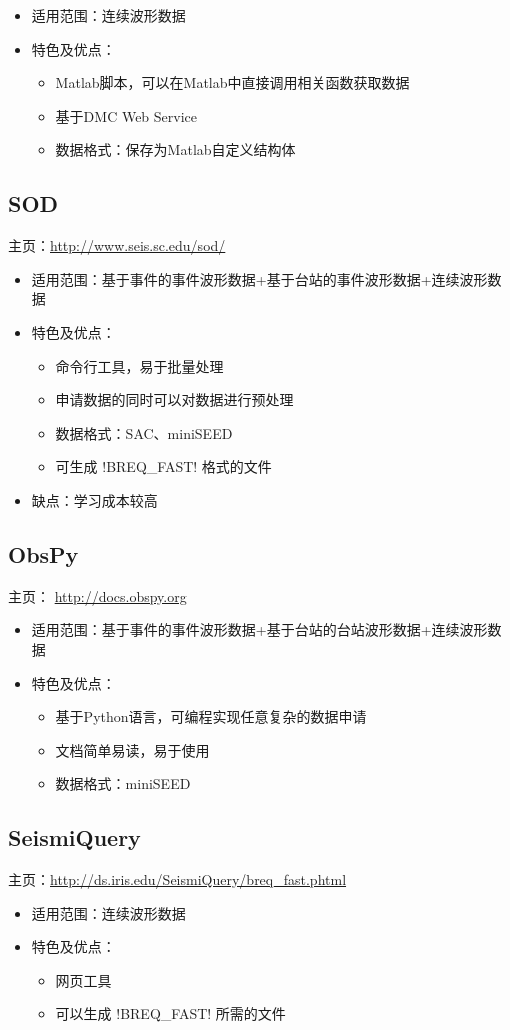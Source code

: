 \begin{itemize}
\item 适用范围：连续波形数据
\item 特色及优点：
    \begin{itemize}
    \item Matlab脚本，可以在Matlab中直接调用相关函数获取数据
    \item 基于DMC Web Service
    \item 数据格式：保存为Matlab自定义结构体
    \end{itemize}
\end{itemize}

\subsection{SOD}
主页：\url{http://www.seis.sc.edu/sod/}

\begin{itemize}
\item 适用范围：基于事件的事件波形数据+基于台站的事件波形数据+连续波形数据
\item 特色及优点：
    \begin{itemize}
    \item 命令行工具，易于批量处理
    \item 申请数据的同时可以对数据进行预处理
    \item 数据格式：SAC、miniSEED
    \item 可生成 !BREQ_FAST! 格式的文件
    \end{itemize}
\item 缺点：学习成本较高
\end{itemize}

\subsection{ObsPy}
主页： \url{http://docs.obspy.org}

\begin{itemize}
\item 适用范围：基于事件的事件波形数据+基于台站的台站波形数据+连续波形数据
\item 特色及优点：
    \begin{itemize}
    \item 基于Python语言，可编程实现任意复杂的数据申请
    \item 文档简单易读，易于使用
    \item 数据格式：miniSEED
    \end{itemize}
\end{itemize}

\subsection{SeismiQuery}
主页：\url{http://ds.iris.edu/SeismiQuery/breq_fast.phtml}

\begin{itemize}
\item 适用范围：连续波形数据
\item 特色及优点：
    \begin{itemize}
    \item 网页工具
    \item 可以生成 !BREQ_FAST! 所需的文件
    \end{itemize}
\end{itemize}
